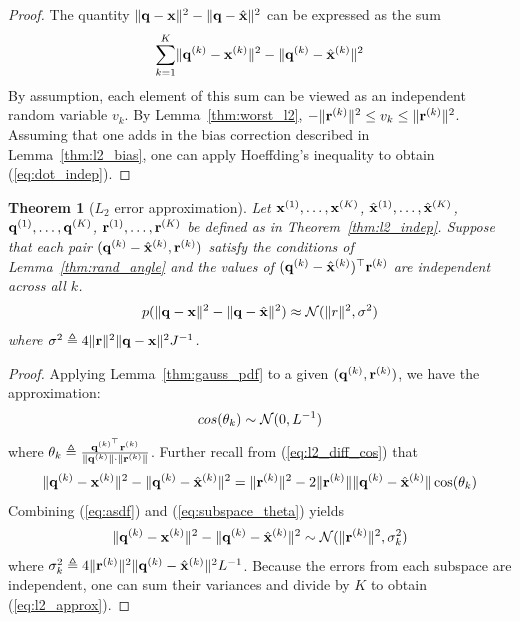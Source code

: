 \documentclass[]{article}
\newtheorem{theorem}{Theorem}[section]
\begin{document}
\begin{proof}
The quantity $\lVert\mathbf{q} - \mathbf{x}\rVert^2 - \lVert\mathbf{q} - \hat{\mathbf{x}}\rVert^2$ can be expressed as the sum
\begin{align}
    \sum_{k=1}^K \lVert\mathbf{q}^{(k)} - \mathbf{x}^{(k)} \rVert^2 - \lVert\mathbf{q}^{(k)} - \hat{\mathbf{x}}^{(k)} \rVert^2
\end{align}
By assumption, each element of this sum can be viewed as an independent random variable $v_k$. By Lemma~\ref{thm:worst_l2}, $-\lVert\mathbf{r}^{(k)}\rVert^2 \le v_k \le \lVert\mathbf{r}^{(k)}\rVert^2$. Assuming that one adds in the bias correction described in Lemma~\ref{thm:l2_bias}, one can apply Hoeffding's inequality to obtain (\ref{eq:dot_indep}).
\end{proof}


\begin{theorem}[$L_2$ error approximation] \label{thm:l2_approx}
Let $\mathbf{x}^{(1)},\ldots,\mathbf{x}^{(K)}$, $\hat{\mathbf{x}}^{(1)},\ldots,\hat{\mathbf{x}}^{(K)}$, \\ $\mathbf{q}^{(1)},\ldots,\mathbf{q}^{(K)}$, $\mathbf{r}^{(1)},\ldots,\mathbf{r}^{(K)}$ be defined as in Theorem~\ref{thm:l2_indep}. Suppose that each pair $(\mathbf{q}^{(k)} - \hat{\mathbf{x}}^{(k)}, \mathbf{r}^{(k)})$ satisfy the conditions of Lemma~\ref{thm:rand_angle} and the values of $(\mathbf{q}^{(k)} - \hat{\mathbf{x}}^{(k)})^\top \mathbf{r}^{(k)}$ are independent across all $k$.
\begin{align} \label{eq:l2_approx}
    p(\lVert\mathbf{q} - \mathbf{x}\rVert^2 - \lVert\mathbf{q} - \hat{\mathbf{x}}\rVert^2) \approx \operatorname{\mathcal{N}}(\lVert r\rVert^2, \sigma^2)
\end{align}
where $\sigma^2 \triangleq 4 \lVert\mathbf{r}\rVert^2\lVert\mathbf{q} - \mathbf{x}\rVert^2 J^{-1}$.
\end{theorem}

\begin{proof}
Applying Lemma~\ref{thm:gauss_pdf} to a given $(\mathbf{q}^{(k)}, \mathbf{r}^{(k)})$, we have the approximation:
\begin{align} \label{eq:subspace_theta}
    cos(\theta_k) \sim \operatorname{\mathcal{N}}(0, L^{-1})
\end{align}
where $\theta_k \triangleq \frac{ \mathbf{q}^{(k)^\top}\mathbf{r}^{(k)} }{ \lVert\mathbf{q}^{(k)}\rVert \cdot \lVert\mathbf{r}^{(k)}\rVert }$. Further recall from (\ref{eq:l2_diff_cos}) that
\begin{align} \label{eq:asdf}
    \lVert\mathbf{q}^{(k)} - \mathbf{x}^{(k)}\rVert^2 - \lVert\mathbf{q}^{(k)} - \hat{\mathbf{x}}^{(k)}\rVert^2 = \lVert\mathbf{r}^{(k)}\rVert^2 - 2\lVert\mathbf{r}^{(k)}\rVert\lVert\mathbf{q}^{(k)} - \hat{\mathbf{x}}^{(k)}\rVert\cos(\theta_k)
\end{align}
Combining (\ref{eq:asdf}) and (\ref{eq:subspace_theta}) yields
\begin{align}
    \lVert\mathbf{q}^{(k)} - \mathbf{x}^{(k)}\rVert^2 - \lVert\mathbf{q}^{(k)} - \hat{\mathbf{x}}^{(k)}\rVert^2 \sim \mathcal{N}(\lVert\mathbf{r}^{(k)}\rVert^2, \sigma_k^2)
\end{align}
where $\sigma_k^2 \triangleq 4 \lVert\mathbf{r}^{(k)}\rVert^2\lVert\mathbf{q}^{(k)} - \hat{\mathbf{x}}^{(k)}\rVert^2 L^{-1}$. Because the errors from each subspace are independent, one can sum their variances and divide by $K$ to obtain (\ref{eq:l2_approx}).

\end{proof}


% 
% 


\end{document}
